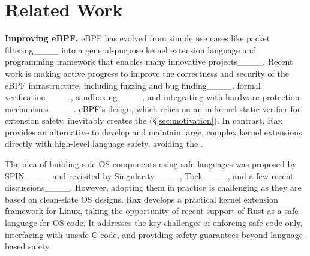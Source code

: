 \section{Related Work}
\label{sec:related}
\vspace{-5pt}

{\bf Improving eBPF.} eBPF has evolved from simple
    use cases like packet filtering____
    into a general-purpose kernel extension language and programming framework
    that enables many innovative projects____.
Recent work is making active progress to improve the correctness and security
    of the eBPF infrastructure, including
    fuzzing and bug finding____,
    formal verification____,
    sandboxing____,
    and integrating with hardware protection mechanisms____.
eBPF's design, which relies on an in-kernel static verifier for extension safety,
    inevitably creates the \gap{} (\S\ref{sec:motivation}).
In contrast, Rax provides an alternative to develop and maintain large, complex kernel extensions directly with
    high-level language safety, avoiding the \gap{}.




 The idea of building safe OS components using
    safe languages was proposed by SPIN____
    and revisited by Singularity____, Tock____, and a few recent
    discussions____.
However, adopting them in practice is challenging as they are based on
    clean-slate OS designs.
Rax develops a practical kernel extension framework for Linux, taking the
    opportunity of recent support of Rust as a safe language for OS code.
It addresses the key challenges of enforcing safe code only, interfacing
    with unsafe C code, and providing safety guarantees beyond language-based safety.

